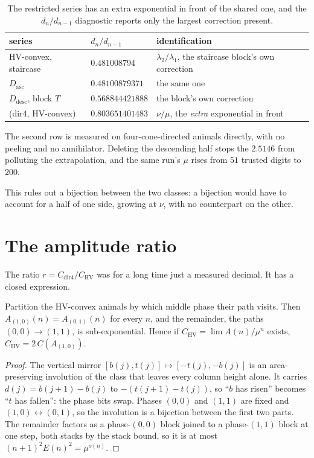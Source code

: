 \documentclass[11pt]{article}
\newcommand{\HV}{\mathrm{HV}}
\begin{document}
\begin{table}[H]
\centering\small
\begin{tabular}{l l l}
\toprule
series & $d_n/d_{n-1}$ & identification \\
\midrule
HV-convex, staircase & $0.481008794$ & $\lambda_2/\lambda_1$, the staircase block's own correction \\
$D_{\mathrm{asc}}$ & $\mathbf{0.48100879371}$ & the same one \\
$D_{\mathrm{desc}}$, block $T$ & $0.568844421888$ & the block's own correction \\
(dir4, HV-convex) & $0.803651401483$ & $\nu/\mu$, the \emph{extra} exponential in front \\
\bottomrule
\end{tabular}
\caption{The restricted series has an extra exponential in front of the shared
one, and the $d_n/d_{n-1}$ diagnostic reports only the largest correction
present.}
\label{tab:tableB}
\end{table}

The second row is measured on four-cone-directed animals directly, with no
peeling and no annihilator. Deleting the descending half stops the $2.5146$ from
polluting the extrapolation, and the same run's $\mu$ rises from $51$ trusted
digits to $200$.

This rules out a bijection between the two classes: a bijection would have to
account for a half of one side, growing at $\nu$, with no counterpart on the
other.

\section{The amplitude ratio}
\label{sec:amplitude}

The ratio $r = C_{\text{dir4}}/C_{\HV}$ was for a long time just a measured
decimal. It has a closed expression.

\begin{proposition}
\label{prop:mirror}
Partition the HV-convex animals by which middle phase their path visits. Then
$A_{(1,0)}(n) = A_{(0,1)}(n)$ for every $n$, and the remainder, the paths
$(0,0)\to(1,1)$, is sub-exponential. Hence if $C_{\HV} = \lim A(n)/\mu^n$
exists, $C_{\HV} = 2\,C(A_{(1,0)})$.
\end{proposition}

\begin{proof}
The vertical mirror $[b(j),t(j)] \mapsto [-t(j),-b(j)]$ is an area-preserving
involution of the class that leaves every column height alone. It carries
$d(j) = b(j{+}1)-b(j)$ to $-(t(j{+}1)-t(j))$, so ``$b$ has risen'' becomes
``$t$ has fallen'': the phase bits swap. Phases $(0,0)$ and $(1,1)$ are fixed
and $(1,0)\leftrightarrow(0,1)$, so the involution is a bijection between the
first two parts. The remainder factors as a phase-$(0,0)$ block joined to a
phase-$(1,1)$ block at one step, both stacks by the stack bound, so it is
at most $(n{+}1)^2E(n)^2 = \mu^{o(n)}$.
\end{proof}
\end{document}

